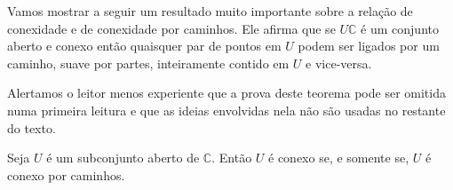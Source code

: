 \medskip 

Vamos mostrar a seguir um resultado muito importante sobre a relação de conexidade e de 
conexidade por caminhos. Ele afirma que se $U\mathbb{C}$ é um 
conjunto aberto e conexo então 
quaisquer par de pontos em $U$ podem ser ligados por um caminho, suave por partes, inteiramente 
contido em $U$ e vice-versa. 

Alertamos o leitor menos experiente que a prova deste teorema pode ser omitida numa primeira
leitura e que as ideias envolvidas nela não são usadas no restante do texto.

\begin{teorema}\label{teo-conexo-conexo-caminhos}
Seja $U$ é um subconjunto aberto  de $\mathbb{C}$. Então $U$ é conexo se, e somente se, 
$U$ é conexo por caminhos.
\end{teorema}

